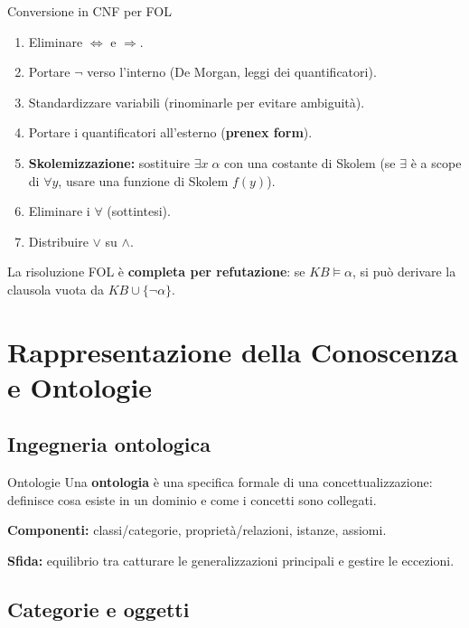 \documentclass[12pt,a4paper]{article}
\begin{document}
\begin{defbox}{Conversione in CNF per FOL}
\begin{enumerate}[noitemsep]
  \item Eliminare $\Leftrightarrow$ e $\Rightarrow$.
  \item Portare $\neg$ verso l'interno (De Morgan, leggi dei quantificatori).
  \item Standardizzare variabili (rinominarle per evitare ambiguità).
  \item Portare i quantificatori all'esterno (\textbf{prenex form}).
  \item \textbf{Skolemizzazione:} sostituire $\exists x\; \alpha$ con una costante di Skolem (se $\exists$ è a scope di $\forall y$, usare una funzione di Skolem $f(y)$).
  \item Eliminare i $\forall$ (sottintesi).
  \item Distribuire $\lor$ su $\land$.
\end{enumerate}
La risoluzione FOL è \textbf{completa per refutazione}: se $KB \models \alpha$, si può derivare la clausola vuota da $KB \cup \{\neg\alpha\}$.
\end{defbox}

\section{Rappresentazione della Conoscenza e Ontologie}

\subsection{Ingegneria ontologica}

\begin{defbox}{Ontologie}
Una \textbf{ontologia} è una specifica formale di una concettualizzazione: definisce cosa esiste in un dominio e come i concetti sono collegati.

\textbf{Componenti:} classi/categorie, proprietà/relazioni, istanze, assiomi.

\textbf{Sfida:} equilibrio tra catturare le generalizzazioni principali e gestire le eccezioni.
\end{defbox}

\subsection{Categorie e oggetti}
\end{document}
